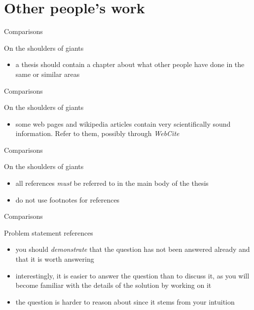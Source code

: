 \documentclass{beamer}
\begin{document}
\section{Other people's work}
\begin{frame}{Comparisons}
\begin{block}{On the shoulders of giants}
\begin{itemize}
\item a thesis should contain a chapter about what other people have done in the same or similar areas
\end{itemize}
\end{block}
\end{frame}


\begin{frame}{Comparisons}
\begin{block}{On the shoulders of giants}
\begin{itemize}
\item some web pages and wikipedia articles contain very scientifically sound information. Refer to them, possibly through \textit{WebCite}
\end{itemize}
\end{block}
\end{frame}


\begin{frame}{Comparisons}
\begin{block}{On the shoulders of giants}
\begin{itemize}
\item all references \textit{must} be referred to in the main body of the thesis
\item do not use footnotes for references
\end{itemize}
\end{block}
\end{frame}


\begin{frame}{Comparisons}
\begin{block}{Problem statement references}
\begin{itemize}
\item you should \textit{demonstrate} that the question has not been answered already and that it is worth answering
\item interestingly, it is easier to answer the question than to discuss it, as you will become familiar with the details of the solution by working on it
\item the question is harder to reason about since it stems from your intuition
\end{itemize}
\end{block}
\end{frame}
\end{document}
